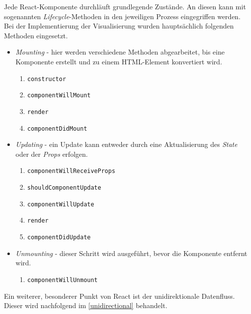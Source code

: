 
Jede React-Komponente durchläuft grundlegende Zustände. An diesen kann mit sogenannten \textit{Lifecycle}-Methoden in den jeweiligen Prozess eingegriffen werden. Bei der Implementierung der Visualisierung wurden hauptsächlich folgenden Methoden eingesetzt.

\begin{itemize}
   \item \textit{Mounting} - hier werden verschiedene Methoden abgearbeitet, bis eine Komponente erstellt und zu einem \gls{HTML}-Element konvertiert wird.
   \begin{enumerate}
     \item \texttt{constructor}
     \item \texttt{componentWillMount}
     \item \texttt{render}
     \item \texttt{componentDidMount}
   \end{enumerate}
   \item \textit{Updating} - ein Update kann entweder durch eine Aktualisierung des \textit{State} oder der \textit{Props} erfolgen.
   \begin{enumerate}
     \item \texttt{componentWillReceiveProps}
     \item \texttt{shouldComponentUpdate}
     \item \texttt{componentWillUpdate}
     \item \texttt{render}
     \item \texttt{componentDidUpdate}
   \end{enumerate}
   \item \textit{Unmounting} - dieser Schritt wird ausgeführt, bevor die Komponente entfernt wird.
   \begin{enumerate}
     \item \texttt{componentWillUnmount}
   \end{enumerate}
\end{itemize}

Ein weiterer, besonderer Punkt von React ist der uni\-di\-rek\-tio\-nale Datenfluss. Dieser wird nachfolgend im \autoref{unidirectional} behandelt. \citep{reactjs, reactjs-blog}


